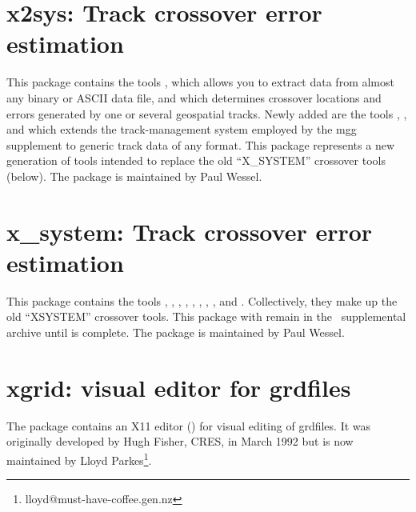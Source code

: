 \section{x2sys: Track crossover error estimation}

This package contains the tools ,
which allows you to extract data from almost any binary or ASCII
data file, and  which determines crossover
locations and errors generated by one or several geospatial tracks.
Newly added are the tools , ,
and  which extends the track-management system
employed by the mgg supplement to generic track data of any format.
This package represents a new generation of tools intended to replace the old
``X\_SYSTEM'' crossover tools (below).  The package is maintained
by Paul Wessel.

\section{x\_system: Track crossover error estimation}

This package contains the tools ,
, , , ,
, , , and
.
Collectively, they make up the old ``XSYSTEM'' crossover tools.  This
package with remain in the \GMT\ supplemental archive until  is complete.
The package is maintained by Paul Wessel.

\section{xgrid: visual editor for grdfiles}

The package contains an X11 editor () for visual
editing of grdfiles.  It was originally developed by Hugh Fisher, CRES,
in March 1992 but is now maintained by Lloyd Parkes\footnote{lloyd@must-have-coffee.gen.nz}.
